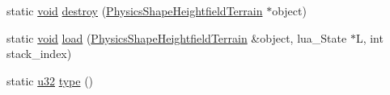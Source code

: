 \begin{DoxyCompactItemize}
static \mbox{\hyperlink{_thread_8h_af1e856da2e658414cb2456cb6f7ebc66}{void}} \mbox{\hyperlink{classnjli_1_1_physics_shape_heightfield_terrain_ae24eb0c7625122d6aa27eafff6b615ab}{destroy}} (\mbox{\hyperlink{classnjli_1_1_physics_shape_heightfield_terrain}{Physics\+Shape\+Heightfield\+Terrain}} $\ast$object)
\item 
static \mbox{\hyperlink{_thread_8h_af1e856da2e658414cb2456cb6f7ebc66}{void}} \mbox{\hyperlink{classnjli_1_1_physics_shape_heightfield_terrain_a85ac02a73a1313365a3f4eb80640a923}{load}} (\mbox{\hyperlink{classnjli_1_1_physics_shape_heightfield_terrain}{Physics\+Shape\+Heightfield\+Terrain}} \&object, lua\+\_\+\+State $\ast$L, int stack\+\_\+index)
\item 
static \mbox{\hyperlink{_util_8h_a10e94b422ef0c20dcdec20d31a1f5049}{u32}} \mbox{\hyperlink{classnjli_1_1_physics_shape_heightfield_terrain_ae596e6bac50ec3eafdcddcbd82176429}{type}} ()
\end{DoxyCompactItemize}
